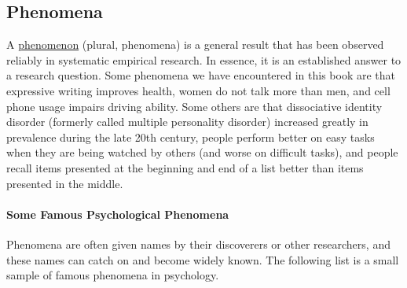 \documentclass[
]{krantz}
\begin{document}
\hypertarget{phenomena}{%
\subsection*{Phenomena}\label{phenomena}}


A \protect\hyperlink{phenomenon}{phenomenon} (plural, phenomena) is a general result that has been observed reliably in systematic empirical research. In essence, it is an established answer to a research question. Some phenomena we have encountered in this book are that expressive writing improves health, women do not talk more than men, and cell phone usage impairs driving ability. Some others are that dissociative identity disorder (formerly called multiple personality disorder) increased greatly in prevalence during the late 20th century, people perform better on easy tasks when they are being watched by others (and worse on difficult tasks), and people recall items presented at the beginning and end of a list better than items presented in the middle.

\hypertarget{some-famous-psychological-phenomena}{%
\paragraph*{Some Famous Psychological Phenomena}\label{some-famous-psychological-phenomena}}

Phenomena are often given names by their discoverers or other researchers, and these names can catch on and become widely known. The following list is a small sample of famous phenomena in psychology.
\end{document}
